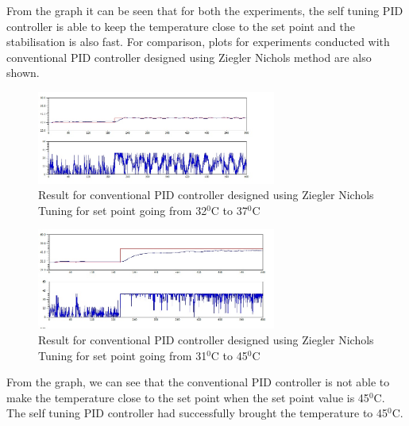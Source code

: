 From the graph it can be seen that for both the experiments, the self tuning PID controller is able to keep the 
temperature close to the set point and the stabilisation is also fast. For comparison, plots for experiments conducted with 
conventional PID controller designed using Ziegler Nichols method are also shown.

\begin{figure}[h]
	\centering
\includegraphics[width=0.7\textwidth]{Vikas_self/report_tex/PID_results/Conventional_Tuning/Setpointchange/PID/step32to37.jpg}
	\caption{Result for conventional PID controller designed using Ziegler Nichols Tuning for set point going from 32$^0$C to 37$^0$C }
	\label{fig:step31to45}
\end{figure}


\begin{figure}[h]
	\centering
\includegraphics[width=0.7\textwidth]{Vikas_self/report_tex/PID_results/Conventional_Tuning/Setpointchange/PID/step31to45.jpg}
	\caption{Result for conventional PID controller designed using Ziegler Nichols Tuning for set point going from 31$^0$C to 45$^0$C }
	\label{fig:step31to45}
\end{figure}

From the graph, we can see that the conventional PID controller is not able to make the temperature close to the set point 
when the set point value is 45$^0$C. The self tuning PID controller had successfully brought the temperature to 45$^0$C.

